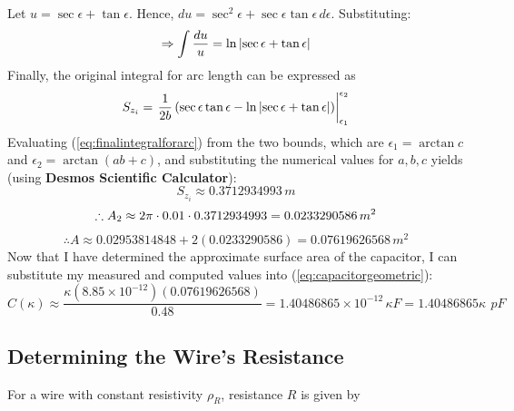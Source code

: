 \documentclass[12pt]{article}
\numberwithin{equation}{section}
\begin{document}
Let $u = \sec{\epsilon} + \tan{\epsilon}$. Hence, $du = \sec^2{\epsilon} + \sec{\epsilon}\tan{\epsilon} \, d\epsilon$. Substituting:
\begin{gather*}
    \Rightarrow \int \frac{du}{u} = \ln{\abs{\sec{\epsilon} + \tan{\epsilon}}}
\end{gather*}
Finally, the original integral for arc length can be expressed as
\begin{equation}\label{eq:finalintegralforarc}
S_{z_i} = \left. \frac{1}{2b} \left( \sec{\epsilon} \tan{\epsilon} - \ln{\abs{\sec{\epsilon} + \tan{\epsilon}}} \right) \right\vert_{\epsilon_1}^{\epsilon_2}
\end{equation}
\noindent Evaluating (\ref{eq:finalintegralforarc}) from the two bounds, which are $\epsilon_1 = \arctan{c}$ and $\epsilon_2 = \arctan{(ab+c)}$, and substituting the numerical values for $a, b, c$ yields (using \textbf{Desmos Scientific Calculator}):
$$S_{z_i} \approx 0.3712934993 \, m $$
\begin{equation}
   \therefore A_2 \approx 2 \pi \cdot 0.01 \cdot 0.3712934993\\
    = 0.0233290586 \, m^2
\end{equation}
\begin{equation}
    \therefore A \approx 0.02953814848 + 2(0.0233290586) = 0.07619626568 \, m^2
\end{equation}
\noindent Now that I have determined the approximate surface area of the capacitor, I can substitute my measured and computed values into (\ref{eq:capacitorgeometric}):
\begin{equation}\label{eq: capacitancevalue}
    C(\kappa) \approx \frac{\kappa (8.85 \times 10^{-12})(0.07619626568)}{0.48} = 1.40486865 \times 10^{-12} \, \kappa F = 1.40486865 \kappa \, \ pF
\end{equation}

\subsection{Determining the Wire's Resistance}
For a wire with constant resistivity $\rho_R$, resistance $R$ is given by
\end{document}
